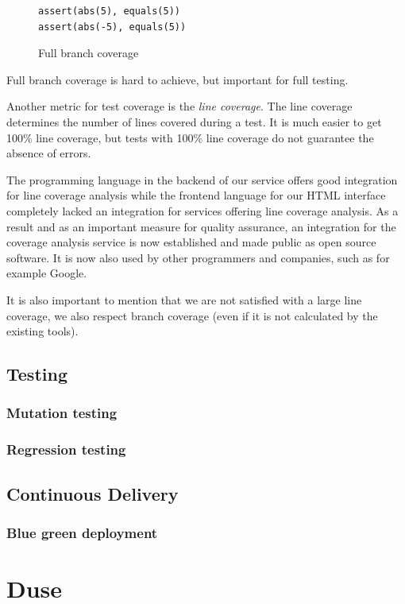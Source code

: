 \begin{figure}
\begin{lstlisting}
assert(abs(5), equals(5))
assert(abs(-5), equals(5))
\end{lstlisting}
\caption{Full branch coverage}
\label{code:fullBranch}
\end{figure}

Full branch coverage is hard to achieve, but important for full testing.

Another metric for test coverage is the \textit{line coverage}. The line
coverage determines the number of lines covered during a test. It is much
easier to get 100\% line coverage, but tests with 100\% line coverage do
not guarantee the absence of errors.

The programming language in the backend of our service offers good integration
for line coverage analysis while the frontend language for our HTML interface
completely lacked an integration for services offering line coverage analysis.
As a result and as an important measure for quality assurance, an integration
for the coverage analysis service is now established and made public as open
source software. It is now also used by other programmers and companies, such
as for example Google.

It is also important to mention that we are not satisfied with a large line
coverage, we also respect branch coverage (even if it is not calculated by
the existing tools).

\section{Testing}
\subsection{Mutation testing}
\subsection{Regression testing}

\section{Continuous Delivery}
\subsection{Blue green deployment}

\chapter{Duse}
